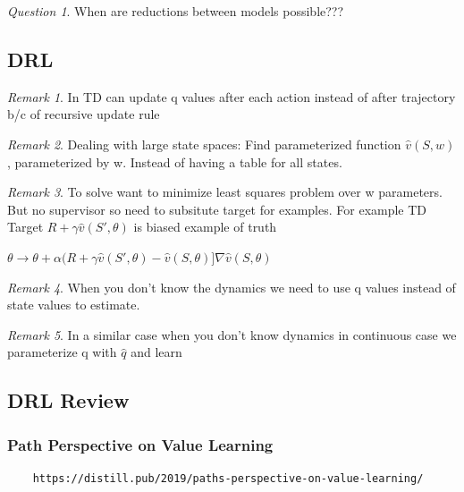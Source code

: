 \documentclass[11pt]{article}
\theoremstyle{remark}
\newtheorem{remark}{Remark}
\newtheorem{quest}{Question}
\begin{document}
\begin{quest}
	When are reductions between models possible???
\end{quest}

\subsection{DRL}

\begin{remark}
	In TD can update q values after each action instead of after trajectory b/c of recursive update rule
\end{remark}

\begin{remark}
	Dealing with large state spaces: Find parameterized function $\hat{v}(S,w)$, parameterized by w. Instead of having a table for all states.
\end{remark}

\begin{remark}
	To solve want to minimize least squares problem over w parameters. But no supervisor so need to subsitute target for examples. For example TD Target $R+\gamma \hat{v}(S',\theta)$ is biased example of truth

	$\theta \to \theta + \alpha(R + \gamma \hat{v}(S',\theta)-\hat{v}(S,\theta)]\nabla \hat{v}(S,\theta)$
\end{remark}

\begin{remark}
	When you don't know the dynamics we need to use q values instead of state values to estimate.
\end{remark}

\begin{remark}
	In a similar case when you don't know dynamics in continuous case we parameterize q with $\hat{q}$ and learn
\end{remark}

\subsection{DRL Review}

\subsubsection{Path Perspective on Value Learning}

\begin{verbatim}
	https://distill.pub/2019/paths-perspective-on-value-learning/
\end{verbatim}
\end{document}
